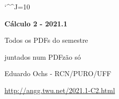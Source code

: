 \documentclass[oneside,12pt]{article}
\begin{document}

\def\drafturl{http://angg.twu.net/LATEX/2021-1-C2.pdf}
\def\drafturl{http://angg.twu.net/2021.1-C2.html}
\def\draftfooter{\tiny \href{\drafturl}{\jobname{}} \ColorBrown{\shorttoday{} \hours}}

\catcode`\^^J=10
\pu



%

\thispagestyle{empty}

\begin{center}

\vspace*{1.2cm}

{\bf \Large Cálculo 2 - 2021.1}

\bsk

Todos os PDFs do semestre

juntados num PDFzão só

\bsk

Eduardo Ochs - RCN/PURO/UFF

\url{http://angg.twu.net/2021.1-C2.html}

\end{center}

\newpage






\end{document}
